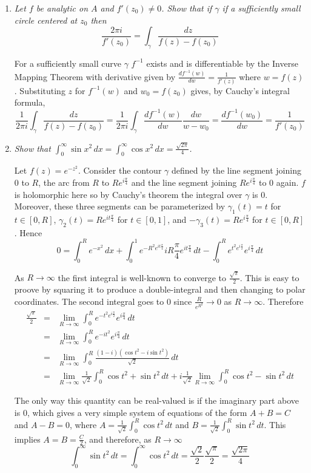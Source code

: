 \documentclass[letterpaper, 11pt]{article}
\begin{document}
\begin{enumerate}
\item \emph{Let $f$ be analytic on $A$ and $f'(z_0) \neq 0$.  Show that if $\gamma$ if a sufficiently small circle centered at $z_0$ then $$\frac{2\pi i}{f'(z_0)} = \int_{\gamma} \frac{dz}{f(z) - f(z_0)}$$}

For a sufficiently small curve $\gamma$ $f^{-1}$ exists and is differentiable by the Inverse Mapping Theorem with derivative given by $\frac{df^{-1}(w)}{dw} = \frac{1}{f'(z)}$ where $w = f(z)$.  Substituting $z$ for $f^{-1}(w)$ and $w_0 = f(z_0)$ gives, by Cauchy's integral formula,
\[
\frac{1}{2\pi i}\int_{\gamma} \frac{dz}{f(z) - f(z_0)} = \frac{1}{2\pi i}\int_{\gamma} \frac{df^{-1}(w)}{dw} \frac{dw}{w - w_0} = \frac{df^{-1}(w_0)}{dw} = \frac{1}{f'(z_0)}
\]

\item \emph{Show that $\int_{0}^\infty \sin x^2 \,dx = \int_{0}^\infty \cos x^2 \,dx = \frac{\sqrt{2\pi}}{4}$.}

Let $f(z) = e^{-z^2}$.  Consider the contour $\gamma$ defined by the line segment joining $0$ to $R$, the arc from $R$ to $Re^{i \frac{\pi}{4}}$ and the line segment joining $Re^{i \frac{\pi}{4}}$ to $0$ again.  $f$ is holomorphic here so by Cauchy's theorem the integral over $\gamma$ is $0$.  Moreover, these three segments can be parameterized by $\gamma_1(t) = t$ for $t \in [0,R]$, $\gamma_2(t) = Re^{it\frac{\pi}{4}}$ for $t \in [0,1]$, and $-\gamma_3(t) = Re^{i\frac{\pi}{4}}$ for $t \in [0,R]$.  Hence
\[
0 = \int_0^R e^{-x^2} \,dx + \int_0^1 e^{-R^2e^{i t \frac{\pi}{4}}} i R \frac{\pi}{4} e^{i t \frac{\pi}{4}} \,dt - \int_0^R e^{t^2 e^{i \frac{\pi}{2}}} e^{i\frac{\pi}{4}} \,dt
\]

As $R \rightarrow \infty$ the first integral is well-known to converge to $\frac{\sqrt{\pi}}{2}$.  This is easy to proove by squaring it to produce a double-integral and then changing to polar coordinates.  The second integral goes to $0$ since $\frac{R}{e^{R^2}} \rightarrow 0$ as $R \rightarrow \infty$.  Therefore
\begin{eqnarray*}
\frac{\sqrt{\pi}}{2} &=& \lim_{R \rightarrow \infty}\int_0^R e^{-t^2 e^{i \frac{\pi}{2}}} e^{i\frac{\pi}{4}} \,dt \\
&=& \lim_{R \rightarrow \infty}\int_0^R e^{-i t^2} e^{i\frac{\pi}{4}} \,dt \\
&=& \lim_{R \rightarrow \infty}\int_0^R \frac{(1-i)(\cos t^2 - i \sin t^2)}{\sqrt{2}} \,dt \\
&=& \lim_{R \rightarrow \infty}\frac{1}{\sqrt{2}}\int_0^R \cos t^2 + \sin t^2 \,dt + i\frac{1}{\sqrt{2}}\lim_{R \rightarrow \infty}\int_0^R \cos t^2 - \sin t^2 \,dt
\end{eqnarray*}

The only way this quantity can be real-valued is if the imaginary part above is $0$, which gives a very simple system of equations of the form $A+B = C$ and $A - B = 0$, where $A = \frac{1}{\sqrt{2}}\int_0^R \cos t^2 \,dt$ and $B = \frac{1}{\sqrt{2}}\int_0^R \sin t^2 \,dt$.  This implies $A = B = \frac{C}{2}$, and therefore, as $R \rightarrow \infty$
\[
\int_0^\infty \sin t^2 \,dt = \int_0^\infty \cos t^2 \,dt = \frac{\sqrt{2}}{2} \frac{\sqrt{\pi}}{2} = \frac{\sqrt{2\pi}}{4}
\]

\end{enumerate}
\end{document}
